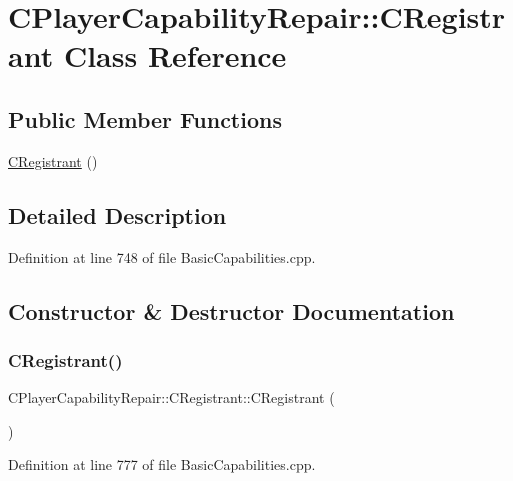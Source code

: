 \hypertarget{classCPlayerCapabilityRepair_1_1CRegistrant}{}\section{C\+Player\+Capability\+Repair\+:\+:C\+Registrant Class Reference}
\label{classCPlayerCapabilityRepair_1_1CRegistrant}
\subsection*{Public Member Functions}
\begin{DoxyCompactItemize}
\item 
\hyperlink{classCPlayerCapabilityRepair_1_1CRegistrant_aeffe332a2dd871a9c29f6d1fa780f473}{C\+Registrant} ()
\end{DoxyCompactItemize}


\subsection{Detailed Description}


Definition at line 748 of file Basic\+Capabilities.\+cpp.



\subsection{Constructor \& Destructor Documentation}
\hypertarget{classCPlayerCapabilityRepair_1_1CRegistrant_aeffe332a2dd871a9c29f6d1fa780f473}{}\label{classCPlayerCapabilityRepair_1_1CRegistrant_aeffe332a2dd871a9c29f6d1fa780f473} 
\subsubsection{\texorpdfstring{C\+Registrant()}{CRegistrant()}}
{\footnotesize\ttfamily C\+Player\+Capability\+Repair\+::\+C\+Registrant\+::\+C\+Registrant (\begin{DoxyParamCaption}{ }\end{DoxyParamCaption})}



Definition at line 777 of file Basic\+Capabilities.\+cpp.



